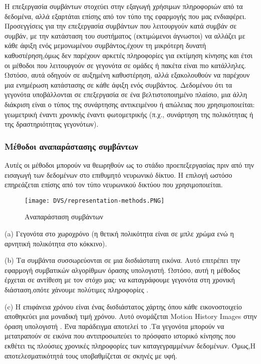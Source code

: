 \documentclass[12pt]{report}
\begin{document}
Η επεξεργασία συμβάντων στοχεύει στην εξαγωγή χρήσιμων πληροφοριών από τα δεδομένα, αλλά εξαρτάται επίσης από τον τύπο της εφαρμογής που μας ενδιαφέρει. Προσεγγίσεις για την επεξεργασία συμβάντων που λειτουργούν κατά συμβάν σε συμβάν, με την κατάσταση του συστήματος (εκτιμώμενοι άγνωστοι) να αλλάζει με κάθε άφιξη ενός μεμονωμένου συμβάντος,έχουν τη μικρότερη δυνατή καθυστέρηση,όμως δεν παρέχουν αρκετές πληροφορίες για εκτίμηση κίνησης και έτσι οι μέθοδοι που λειτουργούν σε γεγονότα σε ομάδες ή πακέτα είναι πιο κατάλληλες. Ωστόσο, αυτά οδηγούν σε αυξημένη καθυστέρηση, αλλά εξακολουθούν να παρέχουν μια  ενημέρωση κατάστασης σε κάθε άφιξη ενός συμβάντος. Δεδομένου ότι τα γεγονότα υποβάλλονται σε επεξεργασία σε ένα βελτιστοποιημένο πλαίσιο, μια άλλη διάκριση είναι ο τύπος της συνάρτησης αντικειμένου ή απώλειας που χρησιμοποιείται: γεωμετρική έναντι χρονικής έναντι φωτομετρικής (π.χ., συνάρτηση της πολικότητας ή της δραστηριότητας γεγονότων).

\subsubsection{Μέθοδοι αναπαράστασης συμβάντων}
Αυτές οι μέθοδοι μπορούν να θεωρηθούν ως το στάδιο προεπεξεργασίας πριν από την εισαγωγή των δεδομένων στο επιθυμητό νευρωνικό δίκτυο. Η επιλογή ωστόσο επηρεάζεται επίσης από τον τύπο νευρωνικού δικτύου που χρησιμοποιείται.
\begin{figure}[htp] %
    \centering
     \texttt{[image: DVS/representation-methods.PNG]}
    \caption{Αναπαράσταση συμβάντων}
    \label{fig:representation-methods}
\end{figure}


(\textlatin{a}) Γεγονότα στο χωροχρόνο (η θετική πολικότητα είναι σε μπλε χρώμα ενώ η αρνητική πολικότητα στο κόκκινο).

(\textlatin{b}) Τα συμβάντα συσσωρεύονται σε μια δισδιάστατη εικόνα. Αυτό επιτρέπει την εφαρμογή συμβατικών αλγορίθμων όρασης υπολογιστή. Ωστόσο, αυτή η μέθοδος έρχεται σε αντίθεση με τον στόχο μας: να καταγράφουμε γεγονότα στη χρονική διάσταση,οπότε χάνουμε πολύτιμες πληροφορίες .

(\textlatin{c}) Η επιφάνεια χρόνου είναι ένας δισδιάστατος χάρτης όπου κάθε εικονοστοιχείο αποθηκεύει μια μοναδική τιμή χρόνου. Αυτό ονομάζεται \textlatin{Motion History Images} στην όραση υπολογιστή \cite{ahad2012}. Ένα παράδειγμα αποτελεί το \cite{lagorge2017} .Τα γεγονότα μπορούν να μετατραπούν σε εικόνα που αντιπροσωπεύει το πρόσφατο ιστορικό κίνησης που εκθέτει τις πλούσιες χρονικές πληροφορίες των καταγεγραμμένων δεδομένων. Όμως,Η αποτελεσματικότητά τους υποβαθμίζεται σε σκηνές με υφή.
\end{document}
